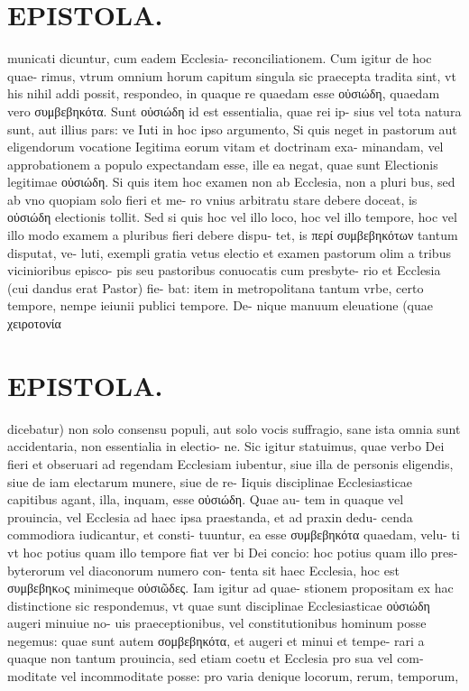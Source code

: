 \documentclass{article}
\begin{document}
\begin{pages}
\section*{EPISTOLA. }municati dicuntur, cum eadem Ecclesia- reconciliationem. Cum igitur de hoc quae- rimus, vtrum omnium horum capitum singula sic praecepta tradita sint, vt his nihil addi possit, respondeo, in quaque re quaedam esse οὐσιώδη, quaedam vero συμβεβηκότα. Sunt οὐσιώδη id est essentialia, quae rei ip- sius vel tota natura sunt, aut illius pars: ve Iuti in hoc ipso argumento, Si quis neget in pastorum aut eligendorum vocatione Iegitima eorum vitam et doctrinam exa- minandam, vel approbationem a populo expectandam esse, ille ea negat, quae sunt Electionis legitimae οὐσιώδη. Si quis item hoc examen non ab Ecclesia, non a pluri bus, sed ab vno quopiam solo fieri et me- ro vnius arbitratu stare debere doceat, is οὐσιώδη electionis tollit. Sed si quis hoc vel illo loco, hoc vel illo tempore, hoc vel illo modo examem a pluribus  fieri debere dispu- tet, is περί συμβεβηκότων tantum disputat, ve- luti, exempli gratia vetus electio et examen pastorum olim a tribus vicinioribus episco- pis seu pastoribus conuocatis cum presbyte- rio et Ecclesia (cui dandus erat Pastor) fie- bat: item in metropolitana tantum vrbe, certo tempore, nempe ieiunii publici tempore. De- nique manuum eleuatione (quae χειροτονία 
\section*{EPISTOLA. }dicebatur) non solo consensu populi, aut solo vocis suffragio, sane ista omnia sunt accidentaria, non essentialia in electio- ne. Sic igitur statuimus, quae verbo Dei fieri et obseruari ad regendam Ecclesiam iubentur, siue illa de personis eligendis, siue de iam electarum munere, siue de re- Iiquis disciplinae Ecclesiasticae capitibus agant, illa, inquam, esse οὐσιώδη. Quae au- tem in quaque vel prouincia, vel Ecclesia ad haec ipsa praestanda, et ad praxin dedu- cenda commodiora iudicantur, et consti- tuuntur, ea esse συμβεβηκότα quaedam, velu- ti vt hoc potius quam illo tempore fiat ver bi Dei concio: hoc potius quam illo pres- byterorum vel diaconorum numero con- tenta sit haec Ecclesia, hoc est συμβεβηκoς minimeque οὐσιῶδες. Iam igitur ad quae- stionem propositam ex hac distinctione sic respondemus, vt quae sunt disciplinae Ecclesiasticae οὐσιώδη augeri minuiue no- uis praeceptionibus, vel constitutionibus hominum posse negemus: quae sunt autem σομβεβηκότα, et augeri et minui et tempe- rari a quaque non tantum prouincia, sed etiam coetu et Ecclesia pro sua vel com- moditate vel incommoditate posse: pro varia denique locorum, rerum, temporum, 

\end{pages}
\end{document}
